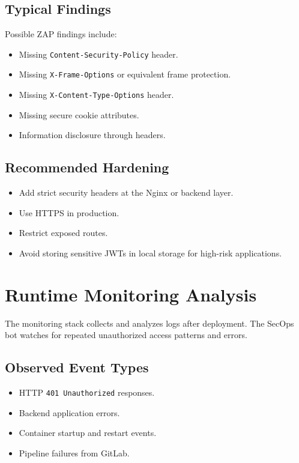 \documentclass[12pt,a4paper]{report}
\begin{document}
\subsection{Typical Findings}

Possible ZAP findings include:

\begin{itemize}[leftmargin=*]
    \item Missing \texttt{Content-Security-Policy} header.
    \item Missing \texttt{X-Frame-Options} or equivalent frame protection.
    \item Missing \texttt{X-Content-Type-Options} header.
    \item Missing secure cookie attributes.
    \item Information disclosure through headers.
\end{itemize}

\subsection{Recommended Hardening}

\begin{itemize}[leftmargin=*]
    \item Add strict security headers at the Nginx or backend layer.
    \item Use HTTPS in production.
    \item Restrict exposed routes.
    \item Avoid storing sensitive JWTs in local storage for high-risk applications.
\end{itemize}

\section{Runtime Monitoring Analysis}

The monitoring stack collects and analyzes logs after deployment. The SecOps bot watches for repeated unauthorized access patterns and errors.

\subsection{Observed Event Types}

\begin{itemize}[leftmargin=*]
    \item HTTP \texttt{401 Unauthorized} responses.
    \item Backend application errors.
    \item Container startup and restart events.
    \item Pipeline failures from GitLab.
\end{itemize}
\end{document}
